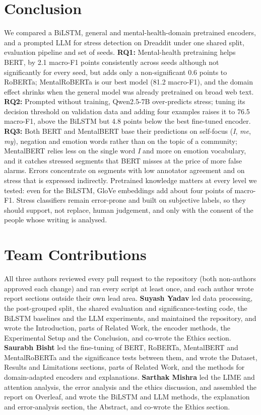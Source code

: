 \section{Conclusion}
We compared a BiLSTM, general and mental-health-domain pretrained encoders, and a prompted LLM for
stress detection on Dreaddit under one shared split, evaluation pipeline and set of seeds.
\textbf{RQ1:} Mental-health pretraining helps BERT, by 2.1 macro-F1 points consistently across
seeds although not significantly for every seed, but adds only a non-significant 0.6 points to
RoBERTa; MentalRoBERTa is our best model (81.2 macro-F1), and the domain effect shrinks when the
general model was already pretrained on broad web text.
\textbf{RQ2:} Prompted without training, Qwen2.5-7B over-predicts stress; tuning its decision
threshold on validation data and adding four examples raises it to 76.5 macro-F1, above the BiLSTM but
4.8 points below the best fine-tuned encoder.
\textbf{RQ3:} Both BERT and MentalBERT base their predictions on self-focus (\emph{I}, \emph{me},
\emph{my}), negation and emotion words rather than on the topic of a community; MentalBERT relies less
on the single word \emph{I} and more on emotion vocabulary, and it catches stressed segments that BERT
misses at the price of more false alarms. Errors concentrate on segments with low annotator
agreement and on stress that is expressed indirectly.
Pretrained knowledge matters at every level we tested: even for the BiLSTM, GloVe embeddings add
about four points of macro-F1. Stress classifiers remain error-prone and built on subjective labels,
so they should support, not replace, human judgement, and only with the consent of the people whose
writing is analysed.

\section*{Team Contributions}
All three authors reviewed every pull request to the repository (both non-authors approved each
change) and ran every script at least once, and each author wrote report sections outside their own
lead area.
\textbf{Suyash Yadav} led data processing, the post-grouped split, the shared evaluation and
significance-testing code, the BiLSTM baselines and the LLM experiments, and maintained the
repository, and wrote the Introduction, parts of Related Work, the encoder methods, the Experimental
Setup and the Conclusion, and co-wrote the Ethics section.
\textbf{Saurabh Bisht} led the fine-tuning of BERT, RoBERTa, MentalBERT and MentalRoBERTa and the
significance tests between them, and wrote the Dataset, Results and
Limitations sections, parts of Related Work, and the methods for domain-adapted encoders and
explanations.
\textbf{Sarthak Mishra} led the LIME and attention analysis, the error analysis and the ethics
discussion, and assembled the report on Overleaf, and wrote the BiLSTM and LLM methods, the
explanation and error-analysis section, the Abstract, and co-wrote the Ethics section.

